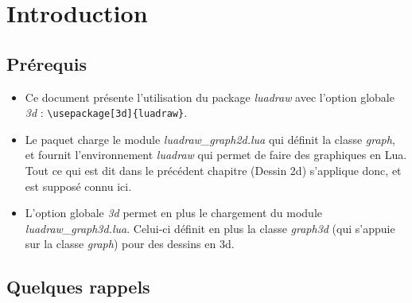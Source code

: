 \section{Introduction}

\subsection{Prérequis}

\begin{itemize}
\item Ce document présente l'utilisation du package \emph{luadraw} avec l'option globale \emph{3d} :
\verb|\usepackage[3d]{luadraw}|.
\item Le paquet charge le module \emph{luadraw\_graph2d.lua} qui définit la classe \emph{graph}, et fournit l'environnement \emph{luadraw} qui permet de faire des graphiques en Lua. Tout ce qui est dit dans le précédent chapitre (Dessin 2d) s'applique donc, et est supposé connu ici.
\item L'option globale \emph{3d} permet en plus le chargement du module \emph{luadraw\_graph3d.lua}. Celui-ci définit en plus la classe \emph{graph3d} (qui s'appuie sur la classe \emph{graph}) pour des dessins en 3d. 
\end{itemize}

\subsection{Quelques rappels}

